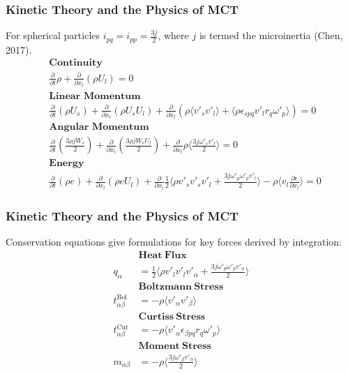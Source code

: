 \documentclass{beamer}
\begin{document}
\begin{frame}
 \frametitle{Kinetic Theory and the Physics of MCT}
For spherical particles $i_{pq} = i_{pp} = \frac{3j}{2}$, where $j$ is termed 
the microinertia (Chen, 2017).
  \begin{align*}
\label{firstordercont3}
&\textbf{Continuity} \nonumber \\
&\frac{\partial }{\partial t}\rho + \frac{\partial }{\partial 
x_l}(\rho U_l) = 0 \\
\label{firstordermoment3}
&\textbf{Linear Momentum} \nonumber \\ 
&\frac{\partial}{\partial t}(\rho U_s)  + \frac{\partial}{\partial x_l}(\rho 
U_sU_l) + \frac{\partial }{\partial x_l}(\rho \langle v'_s v'_l
\rangle + \langle \rho 
\epsilon_{spq} v'_l r_{q}\omega'_{p}
\rangle) = 0\\
\label{firstorderangmoment3}
&\textbf{Angular Momentum} \nonumber \\ 
&\frac{\partial}{\partial t}(\frac{3\rho jW_s}{2}) + 
\frac{\partial}{\partial x_{l}}(\frac{3\rho jW_sU_l}{2}) + 
\frac{\partial}{\partial 
x_{l}}\rho\langle\frac{3 j\omega'_s v'_l}{2}
\rangle = 0 \\ \nonumber 
\label{firstordereenergy3}
&\textbf{Energy} \nonumber \\ 
&\frac{\partial}{\partial t}(\rho e) + \frac{\partial}{\partial 
x_{l}}(\rho eU_l)   + \frac{\partial}{\partial x_{l}}\frac{1}{2}\langle \rho 
v'_{s}v'_{s}v'_{l} + \frac{3j\omega'_{p}\omega'_{p}v'_{l}}{2}
\rangle  -  
\rho \langle v_{l}\frac{\partial e}{\partial x_{l}}
\rangle = 0 
\end{align*}
\end{frame}

\begin{frame}
 \frametitle{Kinetic Theory and the Physics of MCT}
 Conservation equations give formulations for key forces derived by integration:
 \begin{align*}
   &\textbf{Heat} \ \textbf{Flux}\\
q_{\alpha} &= \frac{1}{2}\langle \rho v'_{l}v'_{l}v'_{\alpha} + 
\frac{3j\omega'_{p}\omega'_{p}v'_{\alpha}}{2}
\rangle \\
&\textbf{Boltzmann} \ \textbf{Stress}\\
t^\text{Bol}_{\alpha \beta} &= -\rho \langle v'_\alpha v'_\beta
\rangle \\
&\textbf{Curtiss} \ \textbf{Stress}\\
t^\text{Cur}_{\alpha \beta} &= - \rho \langle v'_\alpha 
\epsilon_{\beta pq}r_{q}\omega'_{p}
\rangle \\
&\textbf{Moment} \ \textbf{Stress}\\
m_{\alpha \beta} &= -\rho \langle \frac{3j\omega'_\beta v'_\alpha}{2}
\rangle
 \end{align*}
\end{frame}
\end{document}
